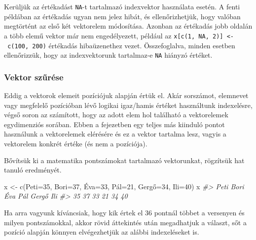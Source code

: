 \documentclass[
]{book}
\newenvironment{Shaded}{\begin{snugshade}}{\end{snugshade}}
\newcommand{\CommentTok}[1]{\textcolor[rgb]{0.56,0.35,0.01}{\textit{#1}}}
\newcommand{\DecValTok}[1]{\textcolor[rgb]{0.00,0.00,0.81}{#1}}
\newcommand{\FunctionTok}[1]{\textcolor[rgb]{0.00,0.00,0.00}{#1}}
\newcommand{\NormalTok}[1]{#1}
\newcommand{\OtherTok}[1]{\textcolor[rgb]{0.56,0.35,0.01}{#1}}
\newcommand{\StringTok}[1]{\textcolor[rgb]{0.31,0.60,0.02}{#1}}
\begin{document}
Kerüljük az értékadást \texttt{NA}-t tartalmazó indexvektor használata esetén. A fenti példában az értékadás ugyan nem jelez hibát, és ellenőrizhetjük, hogy valóban megtörtént az első két vektorelem módosítása. Azonban az értékadás jobb oldalán a több elemű vektor már nem engedélyezett, például az \texttt{x{[}c(1,\ NA,\ 2){]}\ \textless{}-\ c(100,\ 200)} értékadás hibaüzenethez vezet. Összefoglalva, minden esetben ellenőrizzük, hogy az indexvektorunk tartalmaz-e \texttt{NA} hiányzó értéket.

\hypertarget{vektor-szux171ruxe9se}{%
\subsubsection{Vektor szűrése}\label{vektor-szux171ruxe9se}}

Eddig a vektorok elemeit pozíciójuk alapján értük el. Akár sorszámot, elemnevet vagy megfelelő pozícióban lévő logikai igaz/hamis értéket használtunk indexelésre, végső soron az számított, hogy az adott elem hol található a vektorelemek egydimenziós sorában. Ebben a fejezetben egy teljes más kiinduló pontot használunk a vektorelemek elérésére és ez a vektor tartalma lesz, vagyis a vektorelem konkrét értéke (és nem a pozíciója).

Bővítsük ki a matematika pontszámokat tartalmazó vektorunkat, rögzítsük hat tanuló eredményét.

\begin{Shaded}
\begin{Highlighting}[]
\NormalTok{x }\OtherTok{\textless{}{-}} \FunctionTok{c}\NormalTok{(}\StringTok{\textquotesingle{}Peti\textquotesingle{}}\OtherTok{=}\DecValTok{35}\NormalTok{, }\StringTok{\textquotesingle{}Bori\textquotesingle{}}\OtherTok{=}\DecValTok{37}\NormalTok{, }\StringTok{\textquotesingle{}Éva\textquotesingle{}}\OtherTok{=}\DecValTok{33}\NormalTok{, }\StringTok{\textquotesingle{}Pál\textquotesingle{}}\OtherTok{=}\DecValTok{21}\NormalTok{, }\StringTok{\textquotesingle{}Gergő\textquotesingle{}}\OtherTok{=}\DecValTok{34}\NormalTok{, }\StringTok{\textquotesingle{}Ili\textquotesingle{}}\OtherTok{=}\DecValTok{40}\NormalTok{)}
\NormalTok{x}
\CommentTok{\#\textgreater{}  Peti  Bori   Éva   Pál Gergő   Ili }
\CommentTok{\#\textgreater{}    35    37    33    21    34    40}
\end{Highlighting}
\end{Shaded}

Ha arra vagyunk kíváncsiak, hogy kik értek el 36 pontnál többet a versenyen és milyen pontszámokkal, akkor rövid áttekintés után megadhatjuk a választ, sőt a pozíció alapján könnyen elvégezhetjük az alábbi indexeléseket is.
\end{document}
